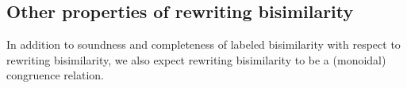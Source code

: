 



\subsection{Other properties of rewriting bisimilarity}

In addition to soundness and completeness of labeled bisimilarity with respect to rewriting bisimilarity, we also expect rewriting bisimilarity to be a (monoidal) congruence relation.


